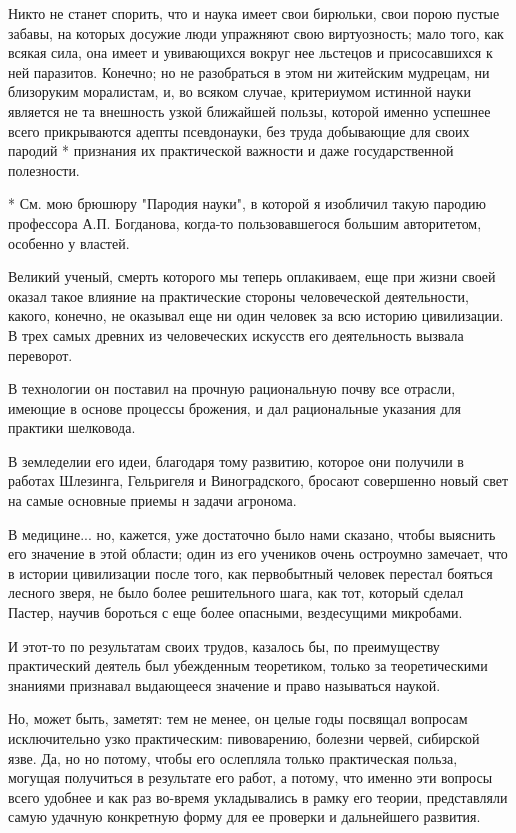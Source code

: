 Никто не станет  спорить, что и наука имеет свои  бирюльки, свои порою
пустые забавы,  на которых  досужие люди упражняют  свою виртуозность;
мало  того,  как всякая  сила,  она  имеет  и увивающихся  вокруг  нее
льстецов и присосавшихся к ней паразитов. Конечно; но не разобраться в
этом ни  житейским мудрецам,  ни близоруким  моралистам, и,  во всяком
случае,  критериумом истинной  науки  является не  та внешность  узкой
ближайшей пользы,  которой именно  успешнее всего  прикрываются адепты
псевдонауки, без  труда добывающие  для своих  пародий *  признания их
практической важности и даже государственной полезности.

*  См.  мою брюшюру  "Пародия  науки",  в  которой я  изобличил  такую
пародию  профессора А.П.  Богданова, когда-то  пользовавшегося большим
авторитетом, особенно у властей.

Великий ученый,  смерть которого мы  теперь оплакиваем, еще  при жизни
своей  оказал  такое  влияние  на  практические  стороны  человеческой
деятельности, какого, конечно, не оказывал  еще ни один человек за всю
историю цивилизации. В трех самых древних из человеческих искусств его
деятельность вызвала переворот.

В технологии  он поставил на  прочную рациональную почву  все отрасли,
имеющие в  основе процессы брожения,  и дал рациональные  указания для
практики шелковода.

В земледелии его идеи, благодаря тому развитию, которое они получили в
работах Шлезинга, Гельригеля и Виноградского, бросают совершенно новый
свет на самые основные приемы н задачи агронома.

В медицине...  но, кажется,  уже достаточно  было нами  сказано, чтобы
выяснить  его значение  в этой  области;  один из  его учеников  очень
остроумно  замечает,  что  в   истории  цивилизации  после  того,  как
первобытный  человек перестал  бояться  лесного зверя,  не было  более
решительного шага, как  тот, который сделал Пастер,  научив бороться с
еще более опасными, вездесущими микробами.

И   этот-то   по   результатам   своих   трудов,   казалось   бы,   по
преимуществу  практический деятель  был убежденным  теоретиком, только
за  теоретическими  знаниями  признавал выдающееся  значение  и  право
называться наукой.

Но,  может  быть,  заметят:  тем  не менее,  он  целые  годы  посвящал
вопросам исключительно узко практическим: пивоварению, болезни червей,
сибирской  язве.  Да,  но  но   потому,  чтобы  его  ослепляла  только
практическая  польза, могущая  получиться  в результате  его работ,  а
потому,  что именно  эти  вопросы  всего удобнее  и  как раз  во-время
укладывались в рамку его теории, представляли самую удачную конкретную
форму для ее проверки и дальнейшего развития.

